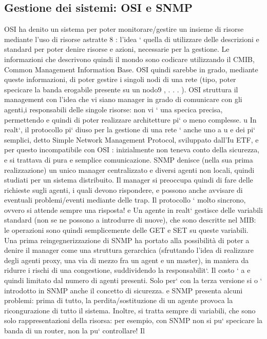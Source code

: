 \documentclass[a4paper,12pt]{article}
\begin{document}
\subsection{Gestione dei sistemi: OSI e SNMP}
OSI ha denito un sistema per poter monitorare/gestire un insieme di risorse
mediante l'uso di risorse astratte 8 : l'idea ` quella di utilizzare delle descrizioni
e
standard per poter denire risorse e azioni, necessarie per la gestione. Le informazioni che descrivono quindi il mondo
sono codicare utilizzando il CMIB,
Common Management Information Base. OSI quindi sarebbe in grado, mediante queste informazioni, di poter gestire i
singoli nodi di una rete (tipo, poter
specicare la banda erogabile presente su un nodo9 , . . . ). OSI struttura il management con l'idea che vi siano manager
in grado di comunicare con gli agenti,i
responsabili delle singole risorse: non vi ` una specica precisa, permettendo
e
quindi di poter realizzare architetture pi` o meno complesse.
u
In realt`, il protocollo pi` diuso per la gestione di una rete ` anche uno
a
u
e
dei pi` semplici, detto Simple Network Management Protocol, sviluppato dall'Iu
ETF, e per questo incompatibile con OSI : inizialmente non teneva conto della
sicurezza, e si trattava di pura e semplice comunicazione.
SNMP denisce (nella sua prima realizzazione) un unico manager centralizzato e diversi agenti non locali, quindi studiati
per un sistema distribuito. Il
manager si preoccupa quindi di fare delle richieste sugli agenti, i quali devono
rispondere, e possono anche avvisare di eventuali problemi/eventi mediante delle
trap. Il protocollo ` molto sincrono, ovvero si attende sempre una risposta!
e
Un agente in realt` gestisce delle variabili standard (non se ne possono
a
introdurre di nuove), che sono descritte nel MIB: le operazioni sono quindi
semplicemente delle GET e SET su queste variabili.
Una prima reingegnerizzazione di SNMP ha portato alla possibilità di poter
a
denire il manager come una struttura gerarchica (sfruttando l'idea di realizzare
degli agenti proxy, una via di mezzo fra un agent e un master), in maniera da
ridurre i rischi di una congestione, suddividendo la responsabilit`. Il costo `
a
e
quindi limitato dal numero di agenti presenti. Solo per` con la terza versione si
o
` introdotto in SNMP anche il concetto di sicurezza.
e
SNMP presenta alcuni problemi: prima di tutto, la perdita/sostituzione di
un agente provoca la ricongurazione di tutto il sistema. Inoltre, si tratta sempre di variabili, che sono solo
rappresentazioni della risorsa: per esempio, con
SNMP non si pu` specicare la banda di un router, non la pu` controllare! Il
\end{document}
